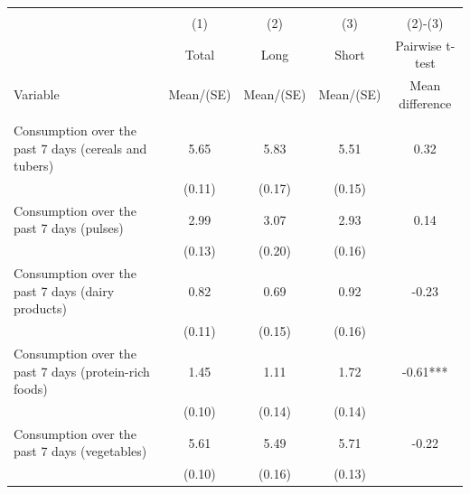 
\begin{tabular}{@{\extracolsep{5pt}}lcccc}
\\[-1.8ex]\hline \hline \\[-1.8ex]
 & \multicolumn{1}{c}{(1)}  & \multicolumn{1}{c}{(2)}  & \multicolumn{1}{c}{(3)}  & \multicolumn{1}{c}{(2)-(3)} \\
 & \multicolumn{1}{c}{Total}  & \multicolumn{1}{c}{Long}  & \multicolumn{1}{c}{Short}  & \multicolumn{1}{c}{Pairwise t-test}  \\
Variable & Mean/(SE) & Mean/(SE) & Mean/(SE) & Mean difference \\ \hline \\[-1.8ex] 
Consumption over the past 7 days (cereals and tubers)   & 5.65    & 5.83    & 5.51    & 0.32   \\
 & (0.11)  & (0.17)  & (0.15)  &  \\ [1ex]
Consumption over the past 7 days (pulses)   & 2.99    & 3.07    & 2.93    & 0.14   \\
 & (0.13)  & (0.20)  & (0.16)  &  \\ [1ex]
Consumption over the past 7 days (dairy products)   & 0.82    & 0.69    & 0.92    & -0.23   \\
 & (0.11)  & (0.15)  & (0.16)  &  \\ [1ex]
Consumption over the past 7 days (protein-rich foods)   & 1.45    & 1.11    & 1.72    & -0.61***   \\
 & (0.10)  & (0.14)  & (0.14)  &  \\ [1ex]
Consumption over the past 7 days (vegetables)   & 5.61    & 5.49    & 5.71    & -0.22   \\
 & (0.10)  & (0.16)  & (0.13)  &  \\ [1ex]

\end{tabular}

